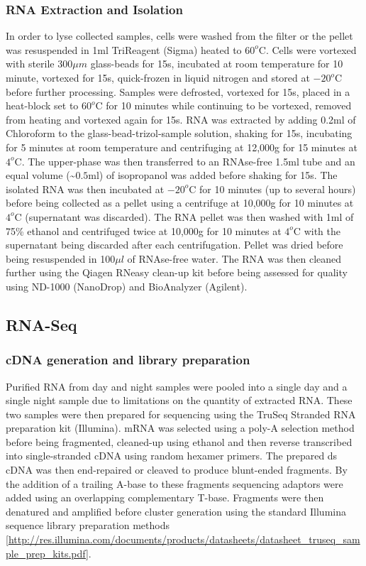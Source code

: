 \subsubsection{RNA Extraction and Isolation}
In order to lyse collected samples, cells were washed from the filter or the pellet was resuspended in 1ml TriReagent (Sigma) heated to $60^{o}$C. Cells were vortexed with sterile 300$\mu m$ glass-beads for 15s, incubated at room temperature for 10 minute, vortexed for 15s, quick-frozen in liquid nitrogen and stored at $-20^{o}$C before further processing.  
Samples were defrosted, vortexed for 15s, placed in a heat-block set to $60^{o}$C for 10 minutes while continuing to be vortexed, removed from heating and vortexed again for 15s.  
RNA was extracted by adding 0.2ml of Chloroform to the glass-bead-trizol-sample solution, shaking for 15s, incubating for 5 minutes at room temperature and centrifuging at 12,000g for 15 minutes at $4^{o}$C.  
The upper-phase was then transferred to an RNAse-free 1.5ml tube and an equal volume (\textasciitilde$0.5$ml) of isopropanol was added before shaking for 15s.  
The isolated RNA was then incubated at $-20^{o}$C for 10 minutes (up to several hours) before being collected as a pellet using a centrifuge at 10,000g for 10 minutes at $4^{o}$C (supernatant was discarded). 
The RNA pellet was then washed with 1ml of 75\% ethanol and centrifuged twice at 10,000g for 10 minutes at $4^{o}$C with the supernatant being discarded after each centrifugation.  
Pellet was dried before being resuspended in 100$\mu l$ of RNAse-free water.  
The RNA was then cleaned further using the Qiagen RNeasy clean-up kit before being assessed for quality using ND-1000 (NanoDrop) and BioAnalyzer (Agilent).

\subsection{RNA-Seq}
\subsubsection{cDNA generation and library preparation}

Purified RNA from day and night samples were pooled into a single day and a single night sample due to limitations on the quantity of extracted RNA. 
These two samples were then prepared for sequencing using the TruSeq Stranded RNA preparation kit (Illumina).  
mRNA was selected using a poly-A selection method before being fragmented, cleaned-up using ethanol and then reverse transcribed into single-stranded cDNA using random hexamer primers. 
The prepared ds cDNA was then end-repaired or cleaved to produce blunt-ended fragments.  
By the addition of a trailing A-base to these fragments sequencing adaptors were added using an overlapping complementary T-base.  
Fragments were then denatured and amplified before cluster generation using the standard Illumina sequence library preparation methods [\url{http://res.illumina.com/documents/products/datasheets/datasheet_truseq_sample_prep_kits.pdf}].

